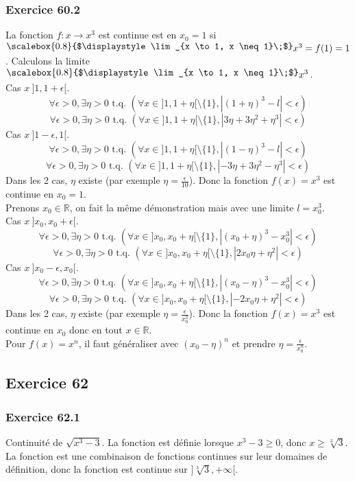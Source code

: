 \documentclass[]{book}
\theoremstyle{definition}
\newcommand{\bb}[1]{\mathbb{#1}}
\newcommand{\R}{\bb{R}}
\begin{document}
\subsubsection*{Exercice 60.2}
La fonction $f: x \to x^3$ est continue est en $x_0 = 1$ si $\raisebox{0.5ex}{\scalebox{0.8}{$\displaystyle \lim_{x \to 1, x \neq 1}\;$}} x^3 = f(1) = 1$.
Calculons la limite $\raisebox{0.5ex}{\scalebox{0.8}{$\displaystyle \lim_{x \to 1, x \neq 1}\;$}} x^3$.\\
Cas $x \ ]1,1+\epsilon[$.
$$\forall \epsilon >0, \exists \eta > 0 \textrm{ t.q. } ( \forall x \in ]1, 1+\eta[ \setminus \{1\}, |(1+\eta)^3-l| <\epsilon)$$
$$\forall \epsilon >0, \exists \eta > 0 \textrm{ t.q. } ( \forall x \in ]1, 1+\eta[ \setminus \{1\}, |3\eta+3\eta^2+\eta^3| <\epsilon)$$
Cas $x \ ]1-\epsilon,1[$.
$$\forall \epsilon >0, \exists \eta > 0 \textrm{ t.q. } ( \forall x \in ]1, 1+\eta[ \setminus \{1\}, |(1-\eta)^3-l| <\epsilon)$$
$$\forall \epsilon >0, \exists \eta > 0 \textrm{ t.q. } ( \forall x \in ]1, 1+\eta[ \setminus \{1\}, |-3\eta+3\eta^2-\eta^3| <\epsilon)$$
Dans les 2 cas, $\eta$ existe (par exemple $\eta = \frac{\epsilon}{10}$). Donc la fonction $f(x)=x^3$ est continue en $x_0=1$.\\

Prenons $x_0 \in \R$, on fait la m\^eme d\'emonstration mais avec une limite $l=x_0^3$.\\ 
Cas $x \ ]x_0,x_0+\epsilon[$.
$$\forall \epsilon >0, \exists \eta > 0 \textrm{ t.q. } ( \forall x \in ]x_0, x_0+\eta[ \setminus \{1\}, |(x_0+\eta)^3-x_0^3| <\epsilon)$$
$$\forall \epsilon >0, \exists \eta > 0 \textrm{ t.q. } ( \forall x \in ]x_0, x_0+\eta[ \setminus \{1\}, |2x_0\eta+\eta^2| <\epsilon)$$
Cas $x \ ]x_0-\epsilon,x_0[$.
$$\forall \epsilon >0, \exists \eta > 0 \textrm{ t.q. } ( \forall x \in ]x_0, x_0+\eta[ \setminus \{1\}, |(x_0-\eta)^3-x_0^3| <\epsilon)$$
$$\forall \epsilon >0, \exists \eta > 0 \textrm{ t.q. } ( \forall x \in ]x_0, x_0+\eta[ \setminus \{1\}, |-2x_0\eta+\eta^2| <\epsilon)$$
Dans les 2 cas, $\eta$ existe (par exemple $\eta = \frac{\epsilon}{x_0^3}$). Donc la fonction $f(x)=x^3$ est continue en $x_0$ donc en tout $x\in\R$.\\

Pour $f(x)=x^n$, il faut g\'en\'eraliser avec $(x_0-\eta)^n$ et prendre $\eta=\frac{\epsilon}{x_0^n}$.


\subsection*{Exercice 62}
\subsubsection*{Exercice 62.1}
Continuit\'e de $\sqrt{x^3-3}$. La fonction est d\'efinie lorsque $x^3-3 \geq 0$, donc $x \geq \sqrt[3]{3}$. La fonction est une combinaison de fonctions continues sur leur domaines de d\'efinition, donc la fonction est continue sur $]\sqrt[3]{3}, +\infty[$. 
\end{document}
